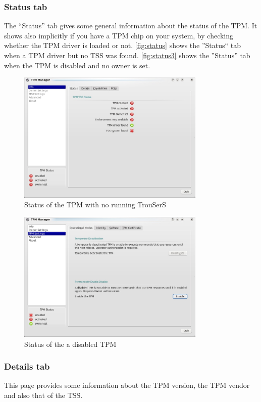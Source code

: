 \documentclass[
  american        %
]{sirrixreport}
\begin{document}
\subsubsection{Status tab} The ``Status'' tab gives some general information about the status of the TPM.
It shows also implicitly if you have a TPM chip on your system, by checking whether the TPM driver is loaded or not. \autoref{fig:status} shows the ''Status`` tab when a TPM driver but no TSS was found. \autoref{fig:status3} shows the ''Status'' tab when the TPM is disabled and no owner is set.
\begin{figure}[h]
 \centering
   \includegraphics[width=0.8\textwidth]{images/tpmmanager_notss.jpg}
   \caption{Status of the TPM with no running TrouSerS}
\label{fig:status}
\end{figure}
\begin{figure}[h]
 \centering
   \includegraphics[width=0.8\textwidth]{images/tpmmanager_disabled.jpg}
   \caption{Status of the a disabled TPM}
\label{fig:status3}
\end{figure}
\clearpage

\subsubsection{Details tab} This page provides some information about the TPM version, the TPM vendor and also that of the TSS.
\end{document}

